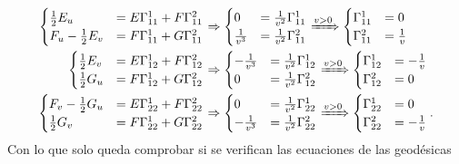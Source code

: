 \begin{align*}
    \begin{cases}
        \frac{1}{2} E_u &= E \Gamma_{11}^1 + F \Gamma_{11}^2\\
        F_u - \frac{1}{2} E_v &= F \Gamma_{11}^1 + G \Gamma_{11}^2
    \end{cases} &\Rightarrow \begin{cases}
        0 &= \frac{1}{v^2} \Gamma_{11}^1\\
        \frac{1}{v^3} &= \frac{1}{v^2} \Gamma_{11}^2
        \end{cases} \xRightarrow{v > 0} \begin{cases}
        \Gamma_{11}^1 &= 0\\
        \Gamma_{11}^2 &= \frac{1}{v}
    \end{cases}\\
    \begin{cases}
        \frac{1}{2}E_v &= E \Gamma_{12}^1 + F \Gamma_{12}^2\\
        \frac{1}{2} G_u &= F \Gamma_{12}^1 + G \Gamma_{12}^2
    \end{cases} &\Rightarrow \begin{cases}
        -\frac{1}{v^3} &= \frac{1}{v^2} \Gamma_{12}^1\\
        0 &= \frac{1}{v^2} \Gamma_{12}^2
    \end{cases} \xRightarrow{v > 0} \begin{cases}
        \Gamma_{12}^1 &= -\frac{1}{v}\\
        \Gamma_{12}^2 &= 0
    \end{cases}\\
    \begin{cases}
        F_v - \frac{1}{2} G_u &= E \Gamma_{22}^1 + F \Gamma_{22}^2\\
        \frac{1}{2} G_v &= F \Gamma_{22}^1 + G \Gamma_{22}^2
    \end{cases} &\Rightarrow \begin{cases}
        0 &= \frac{1}{v^2} \Gamma_{22}^1\\
        -\frac{1}{v^3} &= \frac{1}{v^2} \Gamma_{22}^2
        \end{cases} \xRightarrow{v > 0} \begin{cases}
        \Gamma_{22}^1 &= 0\\
        \Gamma_{22}^2 &= -\frac{1}{v}
    \end{cases}.
\end{align*}
Con lo que solo queda comprobar si se verifican las ecuaciones de las geodésicas
